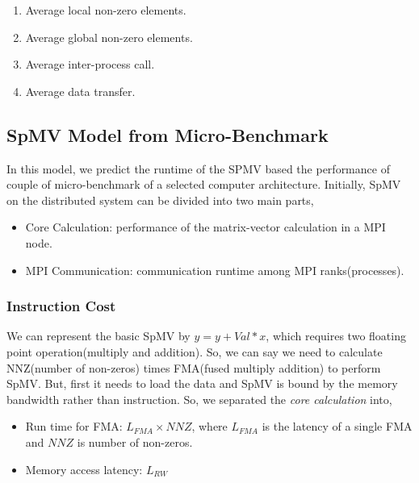 \documentclass[sigconf,review,anonymous]{acmart}
\begin{document}
\begin{enumerate}
\item Average local non-zero elements.
\item Average global non-zero elements.
\item Average inter-process call.
\item Average data transfer.
\end{enumerate}

\subsection{SpMV Model from Micro-Benchmark}
In this model, we predict the runtime of the SPMV based the performance of couple of micro-benchmark of 
a selected computer architecture. Initially, SpMV on the distributed system can be divided into two main parts,
\begin{itemize}
\item Core Calculation: performance of the matrix-vector calculation in a MPI node.
\item MPI Communication: communication runtime among MPI ranks(processes). 
\end{itemize}
\subsubsection{Instruction Cost}
We can represent the basic SpMV by $y=y+Val*x$, which requires two floating point operation(multiply and addition). 
So, we can say we need to calculate NNZ(number of non-zeros) times FMA(fused multiply addition) to perform SpMV.
But, first it needs to load the data and SpMV is bound by the memory bandwidth rather than instruction. So, we 
separated the \textit{core calculation} into,
\begin{itemize}
\item Run time for FMA: $L_{FMA}\times NNZ$, where $L_{FMA}$ is the latency of a single FMA and $NNZ$ is number of non-zeros.
\item Memory access latency: $L_{RW}$
\end{itemize} 
\end{document}
